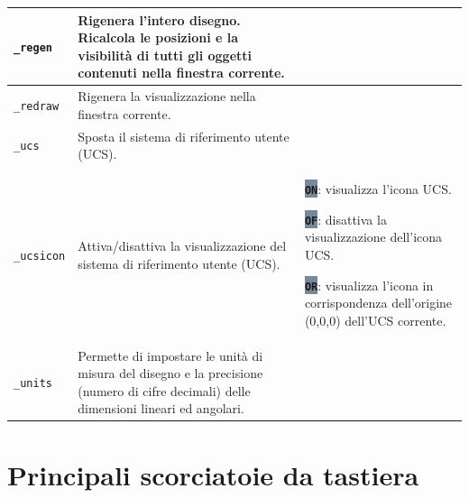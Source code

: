 \documentclass[..]{../IEEEphot}
\newcommand{\param}[1]{\colorbox{LightSlateGray}{\color{Navy}\texttt{\textbf{#1}}}}
\begin{document}
\begin{center}
\begin{longtable}{m{.2\linewidth}m{.33\linewidth}m{.33\linewidth}}
\\
\midrule
\texttt{\_regen} & Rigenera l'intero disegno. Ricalcola le posizioni e la visibilità di tutti gli oggetti contenuti nella finestra corrente. & 
\\
\midrule
\texttt{\_redraw} & Rigenera la visualizzazione nella finestra corrente. & 
\\
\midrule
\texttt{\_ucs} & Sposta il sistema di riferimento utente (UCS). & 
\\
\midrule
\texttt{\_ucsicon} & Attiva/disattiva la visualizzazione del sistema di riferimento utente (UCS). & 
\param{ON}: visualizza l'icona UCS.

\param{OF}: disattiva la visualizzazione dell'icona UCS.

\param{OR}: visualizza l'icona in corrispondenza dell'origine (0,0,0) dell'UCS corrente.
\\
\midrule
\texttt{\_units} & Permette di impostare le unità di misura del disegno e la precisione (numero di cifre decimali) delle dimensioni lineari ed angolari.
\\
\bottomrule
\end{longtable}
\end{center}

\clearpage

\section{Principali scorciatoie da tastiera}
\end{document}
